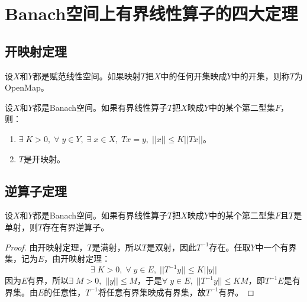\section{Banach空间上有界线性算子的四大定理}

\subsection{开映射定理}
\begin{definition}
	设$X$和$Y$都是赋范线性空间。如果映射$T$把$X$中的任何开集映成$Y$中的开集，则称$T$为\gls{OpenMap}。
\end{definition}
\begin{theorem}[开映射定理]
	设$X$和$Y$都是Banach空间。如果有界线性算子$T$把$X$映成$Y$中的某个第二型集$F$，则：
	\begin{enumerate}
		\item $\exists\;K>0,\;\forall\;y\in Y,\;\exists\;x\in X,\;Tx=y,\;||x||\leqslant K||Tx||$。
		\item $T$是开映射。
	\end{enumerate}
\end{theorem}

\subsection{逆算子定理}
\begin{theorem}
	设$X$和$Y$都是Banach空间。如果有界线性算子$T$把$X$映成$Y$中的某个第二型集$F$且$T$是单射，则$T$存在有界逆算子。
\end{theorem}
\begin{proof}
	由开映射定理，$T$是满射，所以$T$是双射，因此$T^{-1}$存在。任取$Y$中一个有界集，记为$E$，由开映射定理：
	\begin{equation*}
		\exists\;K>0,\;\forall\;y\in E,\;||T^{-1}y||\leqslant K||y||
	\end{equation*}
	因为$E$有界，所以$\exists\;M>0,\;||y||\leqslant M$，于是$\forall\;y\in E,\;||T^{-1}y||\leqslant KM$，即$T^{-1}E$是有界集。由$E$的任意性，$T^{-1}$将任意有界集映成有界集，故$T^{-1}$有界。
\end{proof}
